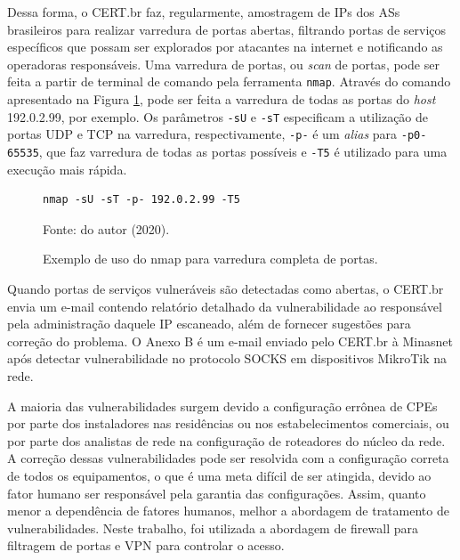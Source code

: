     Dessa forma, o CERT.br faz, regularmente, amostragem de IPs dos ASs brasileiros para realizar varredura de portas abertas, filtrando portas de serviços específicos que possam ser explorados por atacantes na internet e notificando as operadoras responsáveis. Uma varredura de portas, ou \textit{scan} de portas, pode ser feita a partir de terminal de comando pela ferramenta {\tt nmap}. Através do comando apresentado na Figura \ref{fig:nmap}, pode ser feita a varredura de todas as portas do \textit{host} 192.0.2.99, por exemplo. Os parâmetros {\tt -sU} e {\tt -sT} especificam a utilização de portas UDP e TCP na varredura, respectivamente, {\tt -p-} é um \textit{alias} para {\tt -p0-65535}, que faz varredura de todas as portas possíveis e {\tt -T5} é utilizado para uma execução mais rápida.

    \begin{figure}[!htb]
        \centering
        \caption{Exemplo de uso do nmap para varredura completa de portas.} 
        \label{fig:nmap} 
        
        \begin{Verbatim}[fontsize=\normalsize]
            nmap -sU -sT -p- 192.0.2.99 -T5
        \end{Verbatim} 
        
        {\small Fonte: do autor (2020).} 
    \end{figure}
    
    Quando portas de serviços vulneráveis são detectadas como abertas, o CERT.br envia um e-mail contendo relatório detalhado da vulnerabilidade ao responsável pela administração daquele IP escaneado, além de fornecer sugestões para correção do problema. O Anexo B é um e-mail enviado pelo CERT.br à Minasnet após detectar vulnerabilidade no protocolo SOCKS em dispositivos MikroTik na rede.
    
    A maioria das vulnerabilidades surgem devido a configuração errônea de CPEs por parte dos instaladores nas residências ou nos estabelecimentos comerciais, ou por parte dos analistas de rede na configuração de roteadores do núcleo da rede. A correção dessas vulnerabilidades pode ser resolvida com a configuração correta de todos os equipamentos, o que é uma meta difícil de ser atingida, devido ao fator humano ser responsável pela garantia das configurações. Assim, quanto menor a dependência de fatores humanos, melhor a abordagem de tratamento de vulnerabilidades. Neste trabalho, foi utilizada a abordagem de firewall para filtragem de portas e VPN para controlar o acesso. 
    
